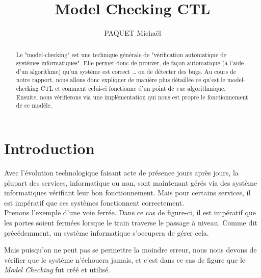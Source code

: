 \documentclass[runningheads,a4paper]{llncs}
\begin{document}
\mainmatter 

\title{Model Checking CTL}


\author{PAQUET Michaël}



\tocauthor{{}}

\maketitle

\begin{abstract}
Le "model-checking" est une technique générale de "vérification automatique de systèmes informatiques". Elle permet donc de prouver, de façon automatique (à l'aide d'un algorithme) qu'un système est correct … ou de détecter des bugs. Au cours de notre rapport, nous allons donc expliquer de manière plus détaillée ce qu'est le model-checking CTL et comment celui-ci fonctionne d'un point de vue algorithmique. Ensuite, nous vérifierons via une implémentation qui nous est propre le fonctionnement de ce modèle. 
\end{abstract}

\medskip

\begingroup
\let\clearpage\relax
\tableofcontents
{}
\endgroup

\medskip
\medskip

\section*{Introduction}

Avec l'évolution technologique faisant acte de présence jours après jours, la plupart des services, informatique ou non, sont maintenant gérés via des système informatiques vérifiant leur bon fonctionnement. Mais pour certains services, il est impératif que ces systèmes fonctionnent correctement.\\


\noindent Prenons l'exemple d'une voie ferrée. Dans ce cas de figure-ci, il est impératif que les portes soient fermées lorsque le train traverse le passage à niveau. Comme dit précédemment, un système informatique s'occupera de gérer cela.

\noindent Mais puisqu'on ne peut pas se permettre la moindre erreur, nous nous devons de vérifier que le système n'échouera jamais, et c'est dans ce cas de figure que le \textit{Model Checking} fut créé et utilisé.\\
\end{document}
